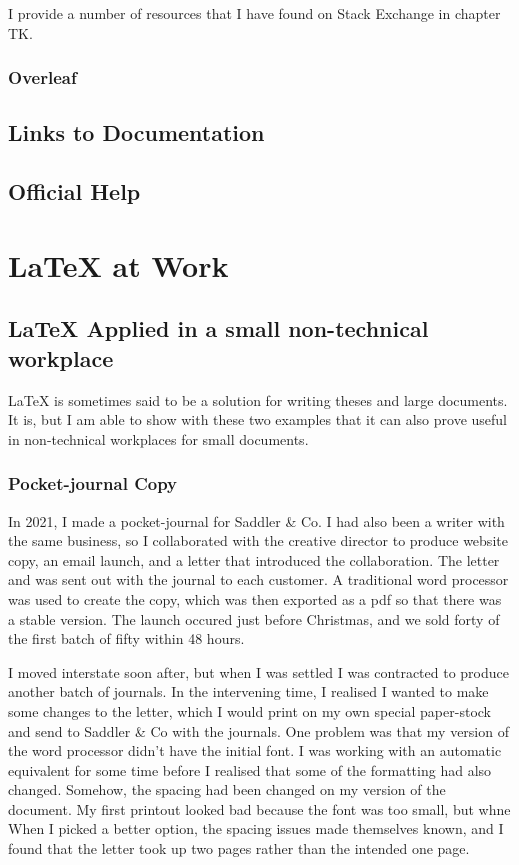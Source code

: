 \documentclass[12pt, oneside]{memoir}
\begin{document}
I provide a number of resources that I have found on Stack Exchange in chapter TK.

\subsection*{Overleaf}

\section*{Links to Documentation}

\section*{Official Help}

\chapter{\LaTeX{} at Work}

\section*{\LaTeX{} Applied in a small non-technical workplace}
\LaTeX{} is sometimes said to be a solution for writing theses and large documents. It is, but I am able to show with these two examples that it can also prove useful in non-technical workplaces for small documents.

\subsection{Pocket-journal Copy}
In 2021, I made a pocket-journal for Saddler \& Co. I had also been a writer with the same business, so I collaborated with the creative director to produce website copy, an email launch, and a letter that introduced the collaboration. The letter and was sent out with the journal to each customer. A traditional word processor was used to create the copy, which was then exported as a pdf so that there was a stable version. The launch occured just before Christmas, and we sold forty of the first batch of fifty within 48 hours.

I moved interstate soon after, but when I was settled I was contracted to produce another batch of journals. In the intervening time, I realised I wanted to make some changes to the letter, which I would print on my own special paper-stock and send to Saddler \& Co with the journals. One problem was that my version of the word processor didn't have the initial font. I was working with an automatic equivalent for some time before I realised that some of the formatting had also changed. Somehow, the spacing had been changed on my version of the document. My first printout looked bad because the font was too small, but whne When I picked a better option, the spacing issues made themselves known, and I found that the letter took up two pages rather than the intended one page.
\end{document}
